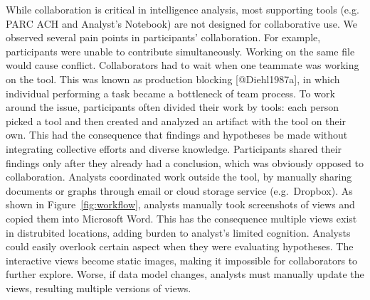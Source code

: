 While collaboration is critical in intelligence analysis, most supporting tools (e.g. PARC ACH and Analyst’s Notebook) are not designed for collaborative use. We observed several pain points in participants’ collaboration. For example, participants were unable to contribute simultaneously. Working on the same file would cause conflict. Collaborators had to wait when one teammate was working on the tool. This was known as production blocking [@Diehl1987a], in which individual performing a task became a bottleneck of team process. To work around the issue, participants often divided their work by tools: each person picked a tool and then created and analyzed an artifact with the tool on their own. This had the consequence that findings and hypotheses be made without integrating collective efforts and diverse knowledge. Participants shared their findings only after they already had a conclusion, which was obviously opposed to collaboration.
Analysts coordinated work outside the tool, by manually sharing documents or graphs through email or cloud storage service (e.g.~Dropbox). As shown in Figure~\ref{fig:workflow}, analysts manually took screenshots of views and copied them into Microsoft Word. This has the consequence multiple views exist in distrubited locations, adding burden to analyst’s limited cognition. Analysts could easily overlook certain aspect when they were evaluating hypotheses. The interactive views become static images, making it impossible for collaborators to further explore. Worse, if data model changes, analysts must manually update the views, resulting multiple versions of views.
